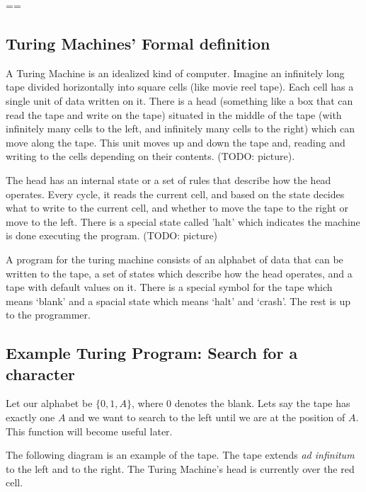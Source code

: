 \documentclass[11pt, letterpaper, twoside, openright]{book}
\begin{document}
==

\subsection{Turing Machines' Formal definition}
A Turing Machine is an idealized kind of computer. Imagine an infinitely long tape divided horizontally into square cells (like movie reel tape). Each cell has a single unit of data written on it. There is a head (something like a box that can read the tape and write on the tape) situated in the middle of the tape (with infinitely many cells to the left, and infinitely many cells to the right) which can move along the tape. This unit moves up and down the tape and, reading and writing to the cells depending on their contents. (TODO: picture).

The head has an internal state or a set of rules that describe how the head operates. Every cycle, it reads the current cell, and based on the state decides what to write to the current cell, and whether to move the tape to the right or move to the left. There is a special state called 'halt' which indicates the machine is done executing the program. (TODO: picture)

A program for the turing machine consists of an alphabet of data that can be written to the tape, a set of states which describe how the head operates, and a tape with default values on it. There is a special symbol for the tape which means `blank' and a spacial state which means `halt' and `crash'. The rest is up to the programmer.

\subsection{Example Turing Program: Search for a character}
Let our alphabet be $\{0, 1, A\}$, where $0$ denotes the blank. Lets say the tape has exactly one $A$ and we want to search to the left until we are at the position of $A$. This function will become useful later.

The following diagram is an example of the tape. The tape extends \textit{ad infinitum} to the left and to the right. The Turing Machine's head is currently over the red cell.

\end{document}
